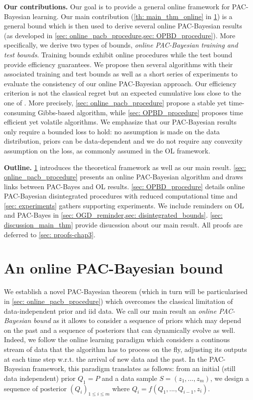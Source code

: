 \textbf{Our contributions.} Our goal is to provide a general online framework for PAC-Bayesian learning. Our main contribution (\cref{th: main_thm_online} in \cref{sec: main_bound}) is a general bound  which is then used to derive several online PAC-Bayesian results (as developed in \cref{sec: online_pacb_procedure,sec: OPBD_procedure}).
More specifically, we derive two types of bounds, \emph{online PAC-Bayesian training and test bounds}.
Training bounds exhibit online procedures while the test bound provide efficiency guarantees. We propose then several algorithms with their associated training and test bounds as well as a short series of experiments to evaluate the consistency of our online PAC-Bayesian approach. Our efficiency criterion is not the classical regret but an expected cumulative loss close to the one of \citet{wintenberger2021stochastic}. More precisely, \cref{sec: online_pacb_procedure} propose a stable yet time-consuming Gibbs-based algorithm, while \cref{sec: OPBD_procedure} proposes time efficient yet volatile algorithms.
We emphasize that our PAC-Bayesian results only require a bounded loss to hold: no assumption is made on the data distribution, priors can be data-dependent and we do not require any convexity assumption on the loss, as commonly assumed in the OL framework.

\textbf{Outline.} \cref{sec: main_bound} introduces the  theoretical framework as well as our main result. \cref{sec: online_pacb_procedure} presents an online PAC-Bayesian algorithm and draws links between PAC-Bayes and OL results.
\cref{sec: OPBD_procedure} details online PAC-Bayesian disintegrated procedures with reduced computational time and \cref{sec: experiments} gathers supporting experiments.
We include reminders on OL and PAC-Bayes in \cref{sec: OGD_reminder,sec: disintegrated_bounds}. \cref{sec: discussion_main_thm} provide disucssion about our main result. All proofs are deferred to \cref{sec: proofs-chap3}.

\section{An online PAC-Bayesian bound}
\label{sec: main_bound}
We establish a novel PAC-Bayesian theorem (which in turn will be particularised in \cref{sec: online_pacb_procedure}) which overcomes the classical limitation of data-independent prior and iid data.
We call our main result an \emph{online PAC-Bayesian bound} as it allows to consider a sequence of priors which may depend on the past and a sequence of posteriors that can dynamically evolve as well. Indeed, we follow the online learning paradigm which considers a continous stream of data that the algorithm has to process on the fly, adjusting its outputs at each time step w.r.t. the arrival of new data and the past. In the PAC-Bayesian framework, this paradigm translates as follows: from an initial (still data independent) prior $Q_1=P$ and a data sample $S= (z_1,...,z_m)$, we design a sequence of posterior $(Q_i)_{1\leq i\leq m }$ where $Q_i= f(Q_1,...,Q_{i-1},z_i)$.


